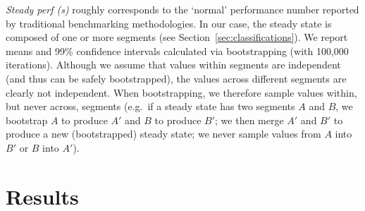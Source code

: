 \documentclass[acmsmall]{acmart}\settopmatter{printfolios=true}
\begin{document}
\emph{Steady perf (s)} roughly corresponds to the `normal' performance number reported by
traditional benchmarking methodologies. In our case, the steady state is composed of one or more
segments (see Section~\ref{sec:classifications}). We report means and
99\% confidence intervals
calculated via bootstrapping (with 100,000 iterations). Although we
assume that values within segments are
independent (and thus can be safely bootstrapped), the values across different segments are clearly not
independent. When bootstrapping, we therefore sample values within, but never
across, segments (e.g.~if a
steady state has two segments $A$ and $B$, we bootstrap $A$ to produce $A'$ and
$B$ to produce $B'$; we then merge $A'$ and $B'$ to produce a new (bootstrapped)
steady state; we never sample values from $A$ into $B'$ or $B$ into $A'$).


\section{Results}
\label{sec:results}
\end{document}
